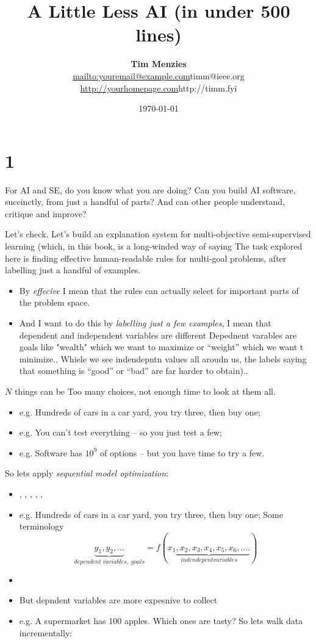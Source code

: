 \documentclass[twocolumn,landscape]{book}
\title{A Little Less AI (in under 500 lines)}
\author{{\bf Tim Menzies}\\ \url{mailto:youremail@example.com}{timm@ieee.org} \\ \url{http://yourhomepage.com}{http://timm.fyi}}
\date{\today}
\begin{document}
\maketitle

\chapter{1}
For AI and SE, do you know what you are doing? 
Can you build AI software, succinctly, from just a handful of parts? And can other people
understand, critique and improve?

Let's check. Let's build an explanation system for multi-objective semi-supervised learning (which, in this book, is a long-winded
way of saying 
The task explored here is finding effective human-readable rules for multi-goal problems, after labelling just a handful of examples.
\begin{itemize}
  \item By {\em effecive} I mean that the rules can actually select for important parts of the problem space.
  \item And I want to do this by {\em labelling just a few examples}, I mean that dependent and independent variables are different
    Depednent varables are goals like "wealth" which we want to maximize or ``weight'' which we want t minimize..
    Whiele we see indendepntn values all aroudn us, the labels saying that something is ``good'' or ``bad'' are far 
    harder to obtain)..
\end{itemize}
$N$ things can be 
Too many choices, not enough time to look at them all.
\begin{itemize}
\item e.g. Hundreds of cars in a car yard, you try three, then buy one;
\item e.g. You can't test everything -- so you just test a few;
\item e.g. Software has $10^9$ of options -- but you  have time to try a few.
\end{itemize}
So lets apply {\em sequential model optimization}:
\begin{itemize}
\item \citet{xia2020sequential}, 
\citet{hutter2011sequential},
\citet{nair2018finding},
\citet{hsu2018arrow},
\citet{mockus1989bayesian},
\citet{golovin17}



\item e.g. Hundreds of cars in a car yard, you try three, then buy one;
Some terminology
\[ \underbrace{y_1,y_2,...}_{\mathit{}dependent\;variables,\;goals} = f(\underbrace{x_1, x_2, x_3, x_4, x_5, x_6,....}_{\mathit{indendepent variables}})
\]
\end{itemize}
\begin{itemize}
\item 
\item But depndent variables are more expesnive to collect 
\item e.g. A supermarket has 100 apples. Which ones are tasty?
So lets walk data incrementally:
\end{itemize}
\end{document}
